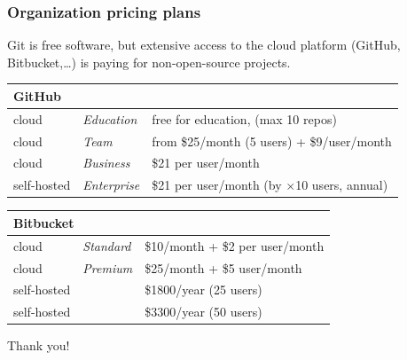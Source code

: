 \documentclass[10pt,svgnames]{beamer}
\begin{document}
\begin{frame}
\frametitle{Organization pricing plans}

Git is free software, but extensive access to the cloud platform (GitHub, Bitbucket,\ldots) is paying for non-open-source projects.

\small

\begin{tabular}{llp{6cm}}
\multicolumn{3}{l}{\textbf{GitHub}}\\
\toprule
cloud       & \emph{Education}  & free for education, (max 10 repos)                       \\
cloud       & \emph{Team}       & from \$25/month (5 users) + \$9/user/month               \\
cloud       & \emph{Business}   & \$21 per user/month                                      \\
\midrule
self-hosted & \emph{Enterprise} & \$21 per user/month (by $\times$10 users, annual) \\
\bottomrule
\end{tabular}

\medskip

\begin{tabular}{lll}
\multicolumn{3}{l}{\textbf{Bitbucket}}\\
\toprule
cloud       & \emph{Standard} & \$10/month + \$2 per user/month \\
cloud       & \emph{Premium}  & \$25/month + \$5 user/month     \\
\midrule
self-hosted &                 & \$1800/year (25 users)          \\
self-hosted &                 & \$3300/year (50 users)          \\
\bottomrule
\end{tabular}
\end{frame}


\begin{frame}[standout]
Thank you!
\end{frame}


\appendix
\end{document}
